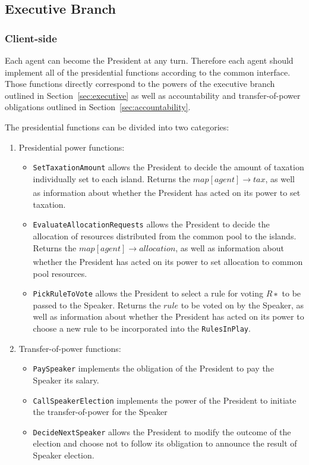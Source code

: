 \subsection{Executive Branch}


\subsubsection{Client-side}
\label{sub:president:client-side}
Each agent can become the President at any turn. Therefore each agent should implement all of the presidential functions according to the common interface. Those functions directly correspond to the powers of the executive branch outlined in Section~\ref{sec:executive} as well as accountability and transfer-of-power obligations outlined in Section~\ref{sec:accountability}. 

The presidential functions can be divided into two categories:
\begin{enumerate}
\item Presidential power functions:
    \begin{itemize}
        \item \texttt{SetTaxationAmount} allows the President to decide the amount of taxation individually set to each island. Returns the $map[agent] \xrightarrow[]{} tax$, as well as information about whether the President has acted on its power to set taxation.
        \item \texttt{EvaluateAllocationRequests} allows the President to decide the allocation of resources distributed from the common pool to the islands. Returns the $map[agent] \xrightarrow[]{} allocation$, as well as information about whether the President has acted on its power to set allocation to common pool resources.
        \item \texttt{PickRuleToVote} allows the President to select a rule for voting $R∗$ to be passed to the Speaker. Returns the $rule$ to be voted on by the Speaker, as well as information about whether the President has acted on its power to choose a new rule to be incorporated into the \texttt{RulesInPlay}.
    \end{itemize}
\item Transfer-of-power functions:
    \begin{itemize}
        \item \texttt{PaySpeaker} implements the obligation of the President to pay the Speaker its salary. 
        \item \texttt{CallSpeakerElection} implements the power of the President to initiate the transfer-of-power for the Speaker
        \item \texttt{DecideNextSpeaker} allows the President to modify the outcome of the election and choose not to follow its obligation to announce the result of Speaker election.
    \end{itemize}
\end{enumerate}

